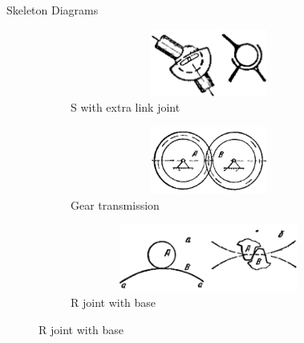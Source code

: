 \documentclass[aspectratio=169]{beamer}
\begin{document}
\begin{frame}[t]{Skeleton Diagrams}
\begin{figure}[H]
    \begin{subfigure}{0.32\textwidth}
        \centering\includegraphics[height=2.2cm,width=1\textwidth,keepaspectratio]{Smin_sd.png}
        \caption*{S with extra link joint}
    \end{subfigure}
    \begin{subfigure}{0.32\textwidth}
        \centering\includegraphics[height=2.2cm,width=1\textwidth,keepaspectratio]{Tooth_sd.png}
        \caption*{Gear transmission}
    \end{subfigure}
    \begin{subfigure}{0.32\textwidth}
        \centering\includegraphics[height=2.2cm,width=1\textwidth,keepaspectratio]{Higher_sd.png}
        \caption*{R joint with base}
    \end{subfigure}
\end{figure}
\end{frame}
\end{document}
